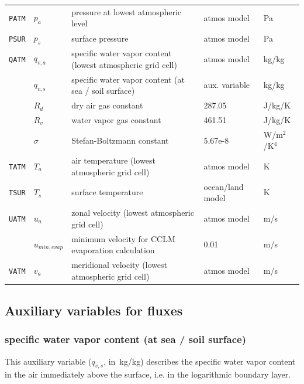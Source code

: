 \documentclass[a4paper,titlepage]{scrartcl}
\begin{document}
\begin{tabular}{lllll}
	\texttt{PATM} & $p_a$          & pressure at lowest atmospheric level                        & atmos model      & Pa      \\
  \texttt{PSUR} & $p_s$          & surface pressure                                            & atmos model      & Pa      \\
  \texttt{QATM} & $q_{v,a}$      & specific water vapor content (lowest atmospheric grid cell) & atmos model      & kg/kg   \\
                & $q_{v,s}$      & specific water vapor content (at sea / soil surface)        & aux. variable    & kg/kg   \\
                & $R_d$          & dry air gas constant                                        & 287.05           & J/kg/K  \\
                & $R_v$          & water vapor gas constant                                    & 461.51           & J/kg/K  \\
								& $\sigma$       & Stefan-Boltzmann constant                                   & 5.67e-8          & W/m$^2$/K$^4$ \\
	\texttt{TATM} & $T_a$          & air temperature (lowest atmospheric grid cell)              & atmos model      & K       \\
	\texttt{TSUR} & $T_s$          & surface temperature                                         & ocean/land model & K       \\
  \texttt{UATM} & $u_a$          & zonal velocity (lowest atmospheric grid cell)               & atmos model      & m/s     \\
	              & $u_{min,evap}$ & minimum velocity for CCLM evaporation calculation           & 0.01             & m/s     \\
  \texttt{VATM} & $v_a$          & meridional velocity (lowest atmospheric grid cell)          & atmos model      & m/s     \\
  \hline \hline
\end{tabular}
\normalsize

\newpage
\subsection{Auxiliary variables for fluxes}
\subsubsection{specific water vapor content (at sea / soil surface)}
This auxiliary variable ($q_{v,s}$, in~kg/kg) describes the specific water vapor content in the air immediately above the surface, i.e. in the logarithmic boundary layer. 
\end{document}
